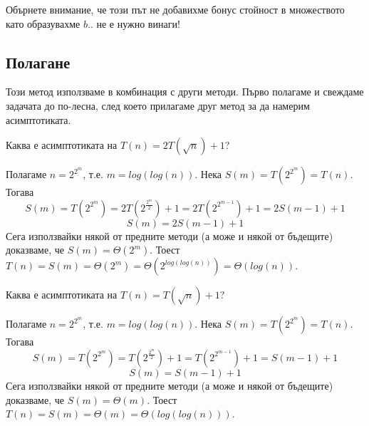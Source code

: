 \begin{solution}
	\begin{remark*}
		Обърнете внимание, че този път не добавихме бонус стойност в множеството като образувахме $b$.. не е нужно винаги!
	\end{remark*}

\end{solution}\leavevmode\newline


\subsection{Полагане}

Този метод използваме в комбинация с други методи. Първо полагаме и свеждаме задачата до по-лесна, след което прилагаме друг метод за да намерим асимптотиката.

\begin{problem}
	Каква е асимптотиката на $T(n)=2T(\sqrt n)+1$?
\end{problem}
\begin{solution}
	Полагаме $n=2^{2^m}$, т.е. $m=log(log(n))$. Нека $S(m)=T(2^{2^m})=T(n)$. Тогава
	\begin{equation*}
		S(m)=T(2^{2^m})=2T(2^{\frac{2^m}2})+1=2T(2^{2^{m-1}})+1=2S(m-1)+1
	\end{equation*}
	\begin{equation*}
		S(m)=2S(m-1)+1
	\end{equation*}
	Сега използвайки някой от предните методи (а може и някой от бъдещите) доказваме, че $S(m)=\Theta(2^m)$. Тоест $T(n)=S(m)=\Theta(2^m)=\Theta(2^{log(log(n))})=\Theta(log(n))$.
\end{solution}\leavevmode\newline

\begin{problem}\label{prob-sqrt-semantics}
	Каква е асимптотиката на $T(n)=T(\sqrt n)+1$?
\end{problem}
\begin{solution}
	Полагаме $n=2^{2^m}$, т.е. $m=log(log(n))$. Нека $S(m)=T(2^{2^m})=T(n)$. Тогава
	\begin{equation*}
		S(m)=T(2^{2^m})=T(2^{\frac{2^m}2})+1=T(2^{2^{m-1}})+1=S(m-1)+1
	\end{equation*}
	\begin{equation*}
		S(m)=S(m-1)+1
	\end{equation*}
	Сега използвайки някой от предните методи (а може и някой от бъдещите) доказваме, че $S(m)=\Theta(m)$. Тоест $T(n)=S(m)=\Theta(m)=\Theta(log(log(n)))$.
\end{solution}\leavevmode\newline


